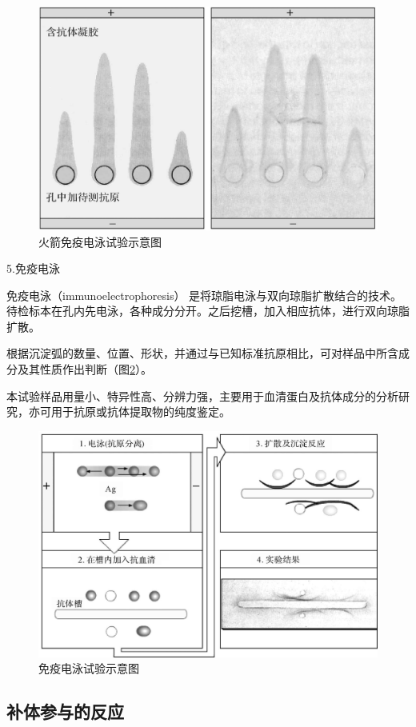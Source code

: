 \begin{figure}[!htbp]
 \centering
 \includegraphics{./images/Image00162.jpg}
 \captionsetup{justification=centering}
 \caption{火箭免疫电泳试验示意图}
 \label{fig10-10}
  \end{figure} 

5.免疫电泳

免疫电泳（immunoelectrophoresis）
是将琼脂电泳与双向琼脂扩散结合的技术。待检标本在孔内先电泳，各种成分分开。之后挖槽，加入相应抗体，进行双向琼脂扩散。

根据沉淀弧的数量、位置、形状，并通过与已知标准抗原相比，可对样品中所含成分及其性质作出判断（图\ref{fig10-11}）。

本试验样品用量小、特异性高、分辨力强，主要用于血清蛋白及抗体成分的分析研究，亦可用于抗原或抗体提取物的纯度鉴定。

\begin{figure}[!htbp]
 \centering
 \includegraphics[width=.6\textwidth]{./images/Image00163.jpg}
 \captionsetup{justification=centering}
 \caption{免疫电泳试验示意图}
 \label{fig10-11}
  \end{figure} 


\subsection{补体参与的反应}

